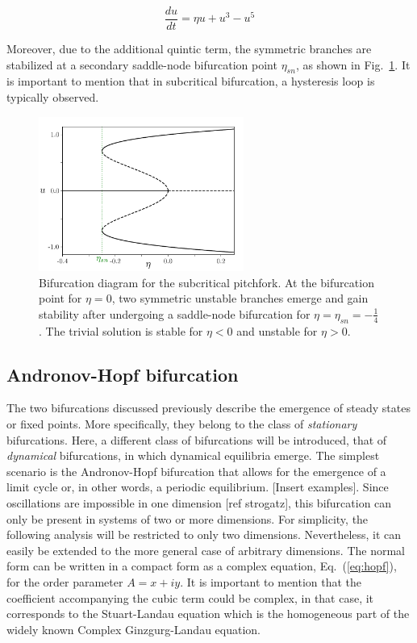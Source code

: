 \begin{equation}
    \dfrac{du}{dt} = \eta u + u ^ 3 - u^5
    \label{eq:pre_bif_pitchfork_subcritical}
\end{equation}

Moreover, due to the additional quintic term, the symmetric branches are stabilized 
at a secondary saddle-node bifurcation point $\eta_{sn}$, as shown
in Fig.~\ref{fig:pre_bif_subpitchfork}. It is important to mention that in subcritical
bifurcation, a hysteresis loop is typically observed. 

\begin{figure}[h]
    \centering
    \includegraphics[width=0.6\textwidth]{imagenes/framework/bif_pitch_subcritical.pdf}
    \caption{Bifurcation diagram for the subcritical pitchfork. At the bifurcation point
    for $\eta=0$, two symmetric unstable branches emerge and gain stability after undergoing
    a saddle-node bifurcation for $\eta=\eta_{sn}=-\frac14$. The trivial solution is stable for $\eta < 0$
    and unstable for $\eta > 0$.}
    \label{fig:pre_bif_subpitchfork}
\end{figure}


\subsection{Andronov-Hopf bifurcation}

The two bifurcations discussed previously describe the emergence of steady states or fixed points. 
More specifically, they belong to the class of {\em stationary} bifurcations. Here, a different class of bifurcations will be introduced,
that of {\em dynamical} bifurcations, in which dynamical equilibria emerge. The simplest scenario is the Andronov-Hopf bifurcation
that allows for the emergence of a limit cycle or, in other words, a periodic equilibrium. [Insert examples]. Since oscillations are impossible in 
one dimension [ref strogatz], this bifurcation can only be present in systems of two or more dimensions. For simplicity, the following
analysis will be restricted to only two dimensions. Nevertheless, it can easily be extended to the more general case of arbitrary dimensions.
The normal form can be written in a compact form as a complex equation, Eq.~(\ref{eq:hopf}), for the
order parameter $A = x +iy$. It is important to mention that
the coefficient accompanying the cubic term could be complex, in that case, it corresponds to the Stuart-Landau equation which
is the homogeneous part of the widely known Complex Ginzgurg-Landau equation.

